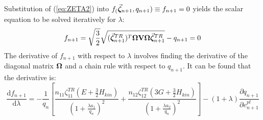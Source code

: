 \begin{appendices}
Substitution of (\ref{eq:ZETA2}) into $f_(\vec{\boldsymbol{\zeta}}_{n+1},q_{n+1})\equiv
f_{n+1}=0$ yields the scalar equation to be solved iteratively for $\lambda$:
\begin{equation}
	f_{n+1} =
	\sqrt{\frac{3}{2}}\sqrt{(\vec{\boldsymbol{\zeta}}^{TR}_{n+1})^T
		\mathbf{\Omega}\mathbf{V}\mathbf{\Omega}\vec{\boldsymbol{\zeta}}^{TR}_{n+1}}- q_{n+1}=0
	\label{eq:SCALAR_FUN}
\end{equation}
The derivative of $f_{n+1}$ with respect to $\lambda$ involves finding the
derivative of the diagonal matrix $\mathbf{\Omega}$ and a chain rule with respect
to $q_{n+1}$. It can be found that the derivative is:
\begin{equation}
	\frac{\text{d} f_{n+1}}{\text{d} \lambda} =
	-\frac{1}{q_n}\left[\frac{n_{11}\zeta_{11}^{TR}(E+
		\frac{3}{2}H_{kin})}{(1+\frac{\lambda a_1}{q_n})^2}+
	\frac{n_{12}\zeta_{12}^{TR}(3G+ \frac{3}{2}H_{kin})}
	{(1+\frac{\lambda a_2}{q_n})^2}  \right] - (1+\lambda)\frac{\partial
		q_{n+1}}{\partial e^{pl}_{n+1}}
	\label{eq:F_DIFF}
\end{equation}


\chapter{}\label{appendix:APPENDIX_D}


\end{appendices}
